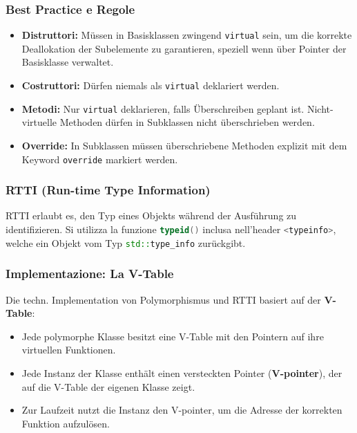 \subsubsection{Best Practice e Regole}
\begin{itemize}
    \item \textbf{Distruttori:} Müssen in Basisklassen zwingend \lstinline|virtual| sein, um die korrekte Deallokation der Subelemente zu garantieren, speziell wenn über Pointer der Basisklasse verwaltet.
    \item \textbf{Costruttori:} Dürfen niemals als \lstinline|virtual| deklariert werden.
    \item \textbf{Metodi:} Nur \texttt{virtual} deklarieren, falls Überschreiben geplant ist. Nicht-virtuelle Methoden dürfen in Subklassen nicht überschrieben werden.
    \item \textbf{Override:} In Subklassen müssen überschriebene Methoden explizit mit dem Keyword \texttt{override} markiert werden.
\end{itemize}

\subsubsection{RTTI (Run-time Type Information)}

RTTI erlaubt es, den Typ eines Objekts während der Ausführung zu identifizieren. Si utilizza la funzione \lstinline[language=C++]|typeid()| 
inclusa nell'header \lstinline[language=C++]|<typeinfo>|, welche ein Objekt vom Typ \lstinline[language=C++]|std::type_info| zurückgibt. 


\subsubsection{Implementazione: La V-Table}

Die techn. Implementation von Polymorphismus und RTTI basiert auf der \textbf{V-Table}:
\begin{itemize}
    \item Jede polymorphe Klasse besitzt eine V-Table mit den Pointern auf ihre virtuellen Funktionen.
    \item Jede Instanz der Klasse enthält einen versteckten Pointer (\textbf{V-pointer}), der auf die V-Table der eigenen Klasse zeigt.
    \item Zur Laufzeit nutzt die Instanz den V-pointer, um die Adresse der korrekten Funktion aufzulösen.
\end{itemize}

